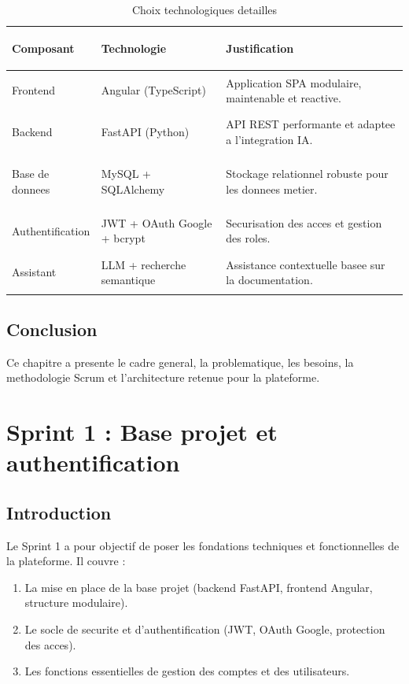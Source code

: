 \documentclass[a4paper,12pt]{report}
\begin{document}
\begin{table}[H]
  \centering
  \caption{Choix technologiques detailles}
  \label{tab:choix_tech_detail}
  \begin{tabularx}{\textwidth}{>{\bfseries\raggedright\arraybackslash}p{2.8cm} p{3.8cm} X}
    \toprule
    Composant & Technologie & Justification \\
    \midrule
    Frontend & Angular (TypeScript) & Application SPA modulaire, maintenable et reactive. \\
    Backend & FastAPI (Python) & API REST performante et adaptee a l'integration IA. \\
    Base de donnees & MySQL + SQLAlchemy & Stockage relationnel robuste pour les donnees metier. \\
    Authentification & JWT + OAuth Google + bcrypt & Securisation des acces et gestion des roles. \\
    Assistant & LLM + recherche semantique & Assistance contextuelle basee sur la documentation. \\
    \bottomrule
  \end{tabularx}
\end{table}

\section*{Conclusion}

Ce chapitre a presente le cadre general, la problematique, les besoins,
la methodologie Scrum et l'architecture retenue pour la plateforme.


\chapter{Sprint 1 : Base projet et authentification}
\minitoc
\newpage

\section*{Introduction}

Le Sprint 1 a pour objectif de poser les fondations techniques et fonctionnelles
de la plateforme. Il couvre :

\begin{enumerate}
  \item La mise en place de la base projet (backend FastAPI, frontend Angular,
  structure modulaire).
  \item Le socle de securite et d'authentification (JWT, OAuth Google,
  protection des acces).
  \item Les fonctions essentielles de gestion des comptes et des utilisateurs.
\end{enumerate}
\end{document}
